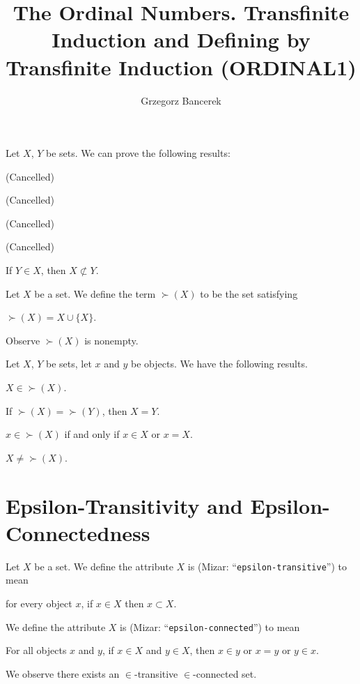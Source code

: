 \documentclass{article}
\title{The Ordinal Numbers. Transfinite Induction and Defining by Transfinite Induction (ORDINAL1)}
\author{Grzegorz Bancerek}
\begin{document}
\maketitle

Let $X$, $Y$ be sets. We can prove the following results:
\begin{thm}
\item\label{ordinal1:1} (Cancelled)
\item\label{ordinal1:2} (Cancelled)
\item\label{ordinal1:3} (Cancelled)
\item\label{ordinal1:4} (Cancelled)
\item\label{ordinal1:5} If $Y\in X$, then $X\nsubset Y$.
\end{thm}

\begin{definition}
Let $X$ be a set. We define the term $\succ(X)$ to be the set satisfying
\begin{defn}
\item $\succ(X)=X\cup\{X\}$.
\end{defn}
\end{definition}

Observe $\succ(X)$ is nonempty.

Let $X$, $Y$ be sets, let $x$ and $y$ be objects.
We have the following results.
\begin{thm}
\item\label{ordinal1:6} $X\in\succ(X)$.
\item\label{ordinal1:7} If $\succ(X)=\succ(Y)$, then $X=Y$.
\item\label{ordinal1:8} $x\in\succ(X)$ if and only if $x\in X$ or $x=X$.
\item\label{ordinal1:9} $X\neq\succ(X)$.
\end{thm}

\section*{Epsilon-Transitivity and Epsilon-Connectedness}

\begin{definition}
Let $X$ be a set.
We define the attribute $X$ is  (Mizar: ``\verb#epsilon-transitive#'')
to mean
\begin{defn}
\item for every object $x$, if $x\in X$ then $x\subset X$.
\end{defn}
We define the attribute $X$ is  (Mizar: ``\verb#epsilon-connected#'')
to mean
\begin{defn}
\item For all objects $x$ and $y$, if $x\in X$ and $y\in X$, then $x\in y$
  or $x=y$ or $y\in x$.
\end{defn}
\end{definition}
We observe there exists an $\in$-transitive $\in$-connected set.
\end{document}
